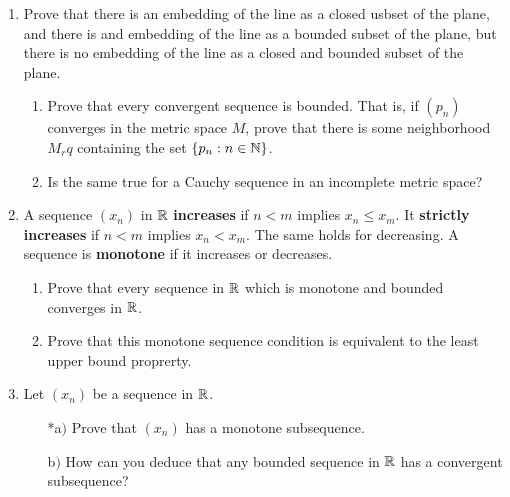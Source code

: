 \documentclass[11pt, a4paper, latinreim, shortsets]{notes}
\begin{document}
\begin{enumerate}[label={\bfseries 2.\arabic*}]
\begin{enumerate}[label=\alph*)]
			\begin{proof}
			The infinite intersection of $(A_n)$ is composed of points that are in each set $A_n$. Suppose
			that more than one point exists in this intersection. Then these points exist in every set, at
			a nonzero distance apart. Thus the diameter is nonzero, as any upper bound must be nonzero, a
			contradiction.

			Now, we'll prove 
			\end{proof}
		\item To what assertions do the sets $[n,\infty)$ provide counterexamples?
	\end{enumerate}

	\item Prove that there is an embedding of the line as a closed usbset of the plane, and there is
	and embedding of the line as a bounded subset of the plane, but there is no embedding of the line as
	a closed and bounded subset of the plane.

	\begin{enumerate}[label=\alph*)]
		\item Prove that every convergent sequence is bounded. That is, if $(p_n)$ converges in the metric
			space $M$, prove that there is some neighborhood $M_r q$ containing the set $\{p_n : n \in \mathbb{N}\}$.
		\item Is the same true for a Cauchy sequence in an incomplete metric space?
	\end{enumerate}

	\item A sequence $(x_n)$ in $\mathbb{R}$ \textbf{increases} if $n < m$ implies $x_n \leq x_m$. It
	\textbf{strictly increases} if $n < m$ implies $x_n < x_m$. The same holds for decreasing. A sequence
	is \textbf{monotone} if it increases or decreases.
	\begin{enumerate}[label=\alph*)]
		\item Prove that every sequence in $\mathbb{R}$ which is monotone and bounded converges in $\mathbb{R}$.
		\item Prove that this monotone sequence condition is equivalent to the least upper bound proprerty.
	\end{enumerate}

	\item Let $(x_n)$ be a sequence in $\mathbb{R}$.
	\begin{enumerate}
		\item[*a$)$] Prove that $(x_n)$ has a monotone subsequence.
		\item[b$)$] How can you deduce that any bounded sequence in $\mathbb{R}$ has a convergent subsequence? 
	\end{enumerate}


\end{enumerate}
\end{document}
